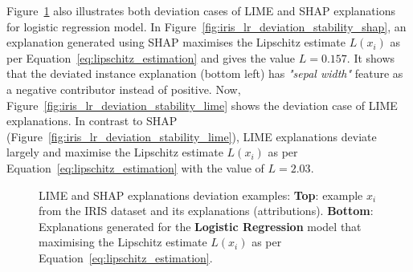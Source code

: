 \documentclass[english]{tktltiki2}
\theoremstyle{definition}
\theoremstyle{remark}
\begin{document}
Figure~\ref{fig:iris_lr_deviation_stability} also illustrates both deviation cases of LIME and SHAP explanations for logistic regression model. In Figure~\ref{fig:iris_lr_deviation_stability_shap}, an explanation generated using SHAP maximises the Lipschitz estimate $L(x_i)$ as per Equation~\eqref{eq:lipschitz_estimation} and gives the value $L=0.157$. It shows that the deviated instance explanation (bottom left) has \textit{"sepal width"} feature as a negative contributor instead of positive. Now, Figure~\ref{fig:iris_lr_deviation_stability_lime} shows the deviation case of LIME explanations. In contrast to SHAP (Figure~\ref{fig:iris_lr_deviation_stability_lime}), LIME explanations deviate largely and maximise the Lipschitz estimate $L(x_i)$ as per Equation~\eqref{eq:lipschitz_estimation} with the value of $L=2.03$. 

\begin{figure}[H]
	\hspace*{\fill}%
	\caption{LIME and SHAP explanations deviation examples: \textbf{Top}: example $x_i$ from the IRIS dataset and its explanations (attributions). \textbf{Bottom}: Explanations generated for the \textbf{Logistic Regression} model that maximising the Lipschitz estimate $L(x_i)$ as per Equation~\eqref{eq:lipschitz_estimation}.}%
	\label{fig:iris_lr_deviation_stability}%
\end{figure}

\end{document}
